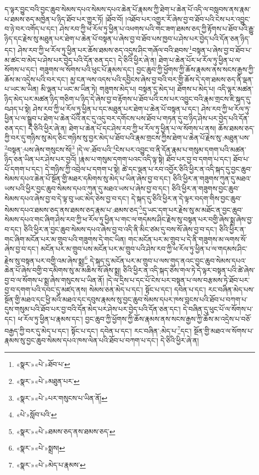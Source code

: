 ད་ལྟར་བྱུང་བའི་བྱང་ཆུབ་སེམས་དཔའ་སེམས་དཔའ་ཆེན་པོ་རྣམས་ཀྱི་ཐེག་པ་ཆེན་པོ་འདི་ལ་བསླབས་ནས་རྣམ་པ་ཐམས་ཅད་མཁྱེན་པ་ཉིད་ཐོབ་པར་གྱུར་ཏོ། །ཐོབ་བོ། །འཐོབ་པར་འགྱུར་རོ་ཞེས་བྱ་བ་ཐོབ་པའི་ངེས་པར་འབྱུང་བ་ཉེ་བར་འགོད་པ་དང་། ཤེས་རབ་ཀྱི་ཕ་རོལ་ཏུ་ཕྱིན་པ་འཕགས་པའི་གང་ཟག་ཐམས་ཅད་ཀྱི་རྟོགས་པ་ཐོབ་པའི་རྒྱུ་ཉིད་དང་རྗེས་སུ་མཐུན་པར་ཐེག་པ་ཆེན་པོ་བསྟན་པ་ཞེས་བྱ་བ་ཐོབ་པས་ཁྱབ་པ་ཤེས་པར་བྱེད་པའི་དོན་ཅན་ཉིད་དང་། ཤེས་རབ་ཀྱི་ཕ་རོལ་ཏུ་ཕྱིན་པར་ཆོས་ཐམས་ཅད་འདུས་ཤིང་གཞོལ་བའི་ཐབས་\footnote{«སྣར་»«པེ་»ཐོབ་པ་}བསྟན་པ་ཞེས་བྱ་བ་ཐོབ་པ་མ་ཚང་བ་མེད་པ་ཤེས་པར་བྱེད་པའི་དོན་ཅན་དང་། དེ་ཅིའི་ཕྱིར་ཞེ་ན། ཐེག་པ་ཆེན་པོར་ཕ་རོལ་ཏུ་ཕྱིན་པ་ལ་སོགས་པ་དང་། གཟུགས་ལ་སོགས་པའི་ཕུང་པོ་རྣམས་དང་། བྱང་ཆུབ་ཀྱི་ཕྱོགས་ཀྱི་ཆོས་རྣམས་ནས་སངས་རྒྱས་ཀྱི་ཆོས་མ་འདྲེས་པའི་བར་དང་། མྱ་ངན་ལས་འདས་པའི་དབྱིངས་ཞེས་བྱ་བའི་བར་གྱི་ཆོས་དེ་དག་ཐམས་ཅད་ནི་ལྡན་པ་ཡང་མ་ཡིན། མི་ལྡན་པ་ཡང་མ་ཡིན་ཏེ། གཟུགས་མེད་པ། བསྟན་དུ་མེད་པ། ཐོགས་པ་མེད་པ། འདི་ལྟར་མཚན་ཉིད་མེད་པར་མཚན་ཉིད་གཅིག་པ་ཉིད་དེ་ཞེས་བྱ་བ་རྟོགས་པ་ཐོབ་པའི་ངས་པར་འབྱུང་བའི་རྣམ་གྲངས་ཇི་སྐད་དུ་བཤད་པ་སྟེ། ཤེས་རབ་ཀྱི་ཕ་རོལ་ཏུ་ཕྱིན་པ་དང་མཐུན་པར་ཐེག་པ་ཆེན་པོ་བསྟན་པ་དང་། ཤེས་རབ་ཀྱི་ཕ་རོལ་ཏུ་ཕྱིན་པ་ལ་སྒྲུབ་པ་ཐེག་པ་ཆེན་པོའི་ནང་དུ་འདུ་བར་དགོངས་པས་ཐོབ་པ་གཏན་དུ་བ་ཉིད་ཤེས་པར་བྱེད་པའི་དོན་ཅན་དང་། དེ་ཅིའི་ཕྱིར་ཞེ་ན། ཐེག་པ་ཆེན་པོ་དང་ཤེས་རབ་ཀྱི་ཕ་རོལ་ཏུ་ཕྱིན་པ་ལ་སོགས་པ་ནས། ཆོས་ཐམས་ཅད་ཀྱི་བར་དུ་གཉིས་སུ་མེད་ཅིང་གཉིས་སུ་བྱར་མེད་པ་ཐོབ་པའི་རྣམ་གྲངས་ཀྱིས་ཐེག་པ་ཆེན་པོ་རྗེས་སུ་:མཐུན་པས་\footnote{«སྣར་»«པེ་»མཐུན་པར་}བསྟན་:པས་ཞེས་གསུངས་སོ།\footnote{«སྣར་»«པེ་»པར་གསུངས་པ་ཡིན་ནོ།} །དེ་ལ་:ཐོབ་པའི་\footnote{«པེ་»སློབ་པའི་}ངེས་པར་འབྱུང་བ་ནི་དོན་རྣམ་པ་གསུམ་དགག་པའི་མཚན་ཉིད་ཅན་ཡིན་པར་ཤེས་པར་བྱའོ། །རྣམ་པ་གསུམ་དགག་པའང་འདི་ལྟ་སྟེ། ཐོབ་པར་བྱ་བ་དགག་པ་དང་། ཐོབ་པ་པོ་དགག་པ་དང་། དེ་གཉིས་ཀྱི་འབྲེལ་པ་དགག་པ་སྟེ། ཚེ་དང་ལྡན་པ་རབ་འབྱོར་ཅིའི་ཕྱིར་ན་འདི་སྐད་དུ་བྱང་ཆུབ་སེམས་དཔའ་ཆེན་པོ་སྔོན་གྱི་མཐར་དམིགས་སུ་མེད་པ་ཡིན་ཞེས་བྱ་བ་དང་། ཅིའི་ཕྱིར་ན་གཟུགས་ཀུན་དུ་མཐའ་ཡས་པའི་ཕྱིར་བྱང་ཆུབ་སེམས་དཔའ་ཀུན་དུ་མཐའ་ཡས་པ་ཞེས་བྱ་བ་དང་། ཅིའི་ཕྱིར་ན་གཟུགས་བྱང་ཆུབ་སེམས་དཔའ་ཞེས་བྱ་བ་དེ་ལྟ་བུ་ཡང་མེད་ཅེས་བྱ་བ་དང་། དེ་སྐད་དུ་ཅིའི་ཕྱིར་ན་དེ་ལྟར་བདག་གིས་བྱང་ཆུབ་སེམས་དཔའ་ཐམས་ཅད་ནས་ཐམས་ཅད་རྣམ་པ་:ཐམས་ཅད་\footnote{«སྣར་»«པེ་»ཐམས་ཅད་ནས་ཐམས་ཅད་}དུ་ཡང་དག་པར་རྗེས་སུ་མ་མཐོང་ན་བྱང་ཆུབ་སེམས་དཔའ་གང་ཞིག་ཤེས་རབ་ཀྱི་ཕ་རོལ་ཏུ་ཕྱིན་པ་གང་ལ་གདམས་ཤིང་རྗེས་སུ་བསྟན་པར་བགྱི་ཞེས་སྨྲ་ཞེས་བྱ་བ་དང་། ཅིའི་ཕྱིར་ན་བྱང་ཆུབ་སེམས་དཔའ་ཞེས་བྱ་བ་འདི་ནི་མིང་ཙམ་དུ་བས་སོ་ཞེས་བྱ་བ་དང་། ཅིའི་ཕྱིར་ན་གང་ཞིག་མངོན་པར་མ་གྲུབ་པའི་གཟུགས་དེ་གང་ཡིན། གང་མངོན་པར་མ་གྲུབ་པ་དེ་ནི་གཟུགས་མ་ལགས་སོ་ཞེས་བྱ་བ་དང་། མངོན་པར་མ་གྲུབ་པས་མངོན་པར་མ་གྲུབ་པའི་ཤེས་རབ་ཀྱི་ཕ་རོལ་ཏུ་ཕྱིན་པ་ལ་གདམས་ཤིང་རྗེས་སུ་བསྟན་པར་བགྱི་འམ་ཞེས་སྨྲ།\footnote{«སྣར་»«པེ་»སྨྲས།} དེ་སྐད་དུ་མངོན་པར་མ་གྲུབ་པ་ལས་གུད་ནའང་བྱང་ཆུབ་སེམས་དཔའ་ཆེན་པོ་ཞེས་བགྱི་བ་དམིགས་སུ་མ་མཆིས་སོ་ཞེས་སྨྲ། ཅིའི་ཕྱིར་ན་འདི་སྐད་ཅེས་གལ་ཏེ་དེ་ལྟར་བསྟན་པའི་ཚེ་ཞེས་བྱ་བ་ལ་སོགས་པ་སྨྲ་ཞེས་གསུངས་པ་ཡིན་ནོ། །དེ་ལ་དྲིས་པ་དང་པོ་ངེས་པར་བསྟན་པ་ལས་བརྩམས་ཏེ་ཐོབ་པར་བྱ་བ་དགག་པའི་དབང་དུ་མཛད་ནས། སེམས་ཅན་མེད་པ་དང་། སྟོང་པ་དང་། དབེན་པ་དང་། རང་བཞིན་མེད་པས་སྔོན་གྱི་མཐའ་དང་ཕྱི་མའི་མཐའ་དང་དབུས་རྣམས་སུ་བྱང་ཆུབ་སེམས་དཔར་ཁས་བླངས་པའི་ཐོབ་པ་བཀག་པ་དུས་གསུམ་པའི་ཐོབ་པར་བྱ་བའི་དོན་མེད་པར་ཤེས་པར་བྱེད་པའི་དོན་ཅན་དང་། དེ་བཞིན་དུ་ཕུང་པོ་ལ་སོགས་པ་དང་། ཕ་རོལ་ཏུ་ཕྱིན་པ་རྣམས་དང་། བྱང་ཆུབ་ཀྱི་ཕྱོགས་ཀྱི་ཆོས་རྣམས་ནས་སངས་རྒྱས་ཀྱི་ཆོས་མ་འདྲེས་པ་བཅོ་བརྒྱད་ཀྱི་བར་དུ་མེད་པ་དང་། སྟོང་པ་དང་། དབེན་པ་དང་། རང་བཞིན་:མེད་པ་\footnote{«སྣར་»«པེ་»མེད་པ་རྣམས་}དང་། སྔོན་གྱི་མཐའ་ལ་སོགས་པ་རྣམས་སུ་བྱང་ཆུབ་སེམས་དཔའ་ཁས་ལེན་པའི་ཐོབ་པ་བཀག་པ་དང་། དེ་ཅིའི་ཕྱིར་ཞེ་ན། 